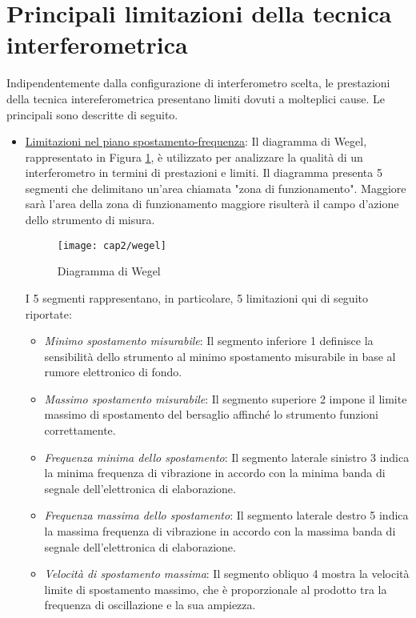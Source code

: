 \section{Principali limitazioni della tecnica interferometrica}
Indipendentemente dalla configurazione di interferometro scelta, le prestazioni della tecnica intereferometrica presentano limiti dovuti a molteplici cause. Le principali sono descritte di seguito.
 
 \begin{itemize}
	\item \underline{Limitazioni nel piano spostamento-frequenza}: Il diagramma di Wegel, rappresentato in Figura \ref{wegel}, è utilizzato per analizzare la qualità di un interferometro in termini di prestazioni e limiti. Il diagramma presenta 5 segmenti che delimitano un'area chiamata "zona di funzionamento". Maggiore sarà l'area della zona di funzionamento maggiore risulterà il campo d'azione dello strumento di misura.
	\begin{figure}[H]
		\begin{center}
			\texttt{[image: cap2/wegel]}
			\caption{Diagramma di Wegel}
			\label{wegel}
		\end{center}
	\end{figure}
 
		I 5 segmenti rappresentano, in particolare, 5 limitazioni qui di seguito riportate:
		\begin{itemize}
		\item \textit{Minimo spostamento misurabile}: Il segmento inferiore 1 definisce la sensibilità dello strumento al minimo spostamento misurabile in base al rumore elettronico di fondo.
		\item \textit{Massimo spostamento misurabile}: Il segmento superiore 2 impone il limite massimo di spostamento del bersaglio affinché lo strumento funzioni correttamente.
		\item \textit{Frequenza minima dello spostamento}: Il segmento laterale sinistro 3 indica la minima frequenza di vibrazione in accordo con la minima banda di segnale dell'elettronica di elaborazione.
		\item \textit{Frequenza massima dello spostamento}: Il segmento laterale destro 5 indica la massima frequenza di vibrazione in accordo con la massima banda di segnale dell'elettronica di elaborazione.
		\item \textit{Velocità di spostamento massima}: Il segmento obliquo 4 mostra la velocità limite di spostamento massimo, che è proporzionale al prodotto tra la frequenza di oscillazione e la sua ampiezza.
		\end{itemize}
	

\end{itemize}
